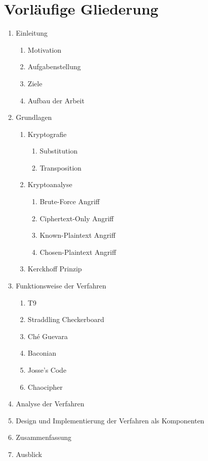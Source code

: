 \documentclass[fontsize=11pt, paper=a4, parskip=half]{scrartcl}
\begin{document}
\section{Vorläufige Gliederung}
\begin{enumerate}
	\item{Einleitung}
		\begin{enumerate}[label={\arabic*.}]
		\item{Motivation}
		\item{Aufgabenstellung}
		\item{Ziele}
		\item{Aufbau der Arbeit}
		\end{enumerate}
	\item{Grundlagen}
		\begin{enumerate}[label={\arabic*.}]
			\item{Kryptografie}
				\begin{enumerate}[label={\arabic*.}]
					\item{Substitution}
					\item{Transposition}
				\end{enumerate}
			\item{Kryptoanalyse}
				\begin{enumerate}[label={\arabic*.}]
					\item{Brute-Force Angriff}
					\item{Ciphertext-Only Angriff}
					\item{Known-Plaintext Angriff}
					\item{Chosen-Plaintext Angriff}
				\end{enumerate}
			\item{Kerckhoff Prinzip}
		\end{enumerate}
	\item{Funktionsweise der Verfahren}
		\begin{enumerate}[label={\arabic*.}]
			\item{T9}
			\item{Straddling Checkerboard}
			\item{Ché Guevara}
			\item{Baconian}
			\item{Josse's Code}
			\item{Chaocipher}
		\end{enumerate}
	\item{Analyse der Verfahren}
	\item{Design und Implementierung der Verfahren als Komponenten}
	\item{Zusammenfassung}
	\item{Ausblick}
\end{enumerate}

\newpage


\nocite{*}
\cleardoublepage
{}
{}

\end{document}
